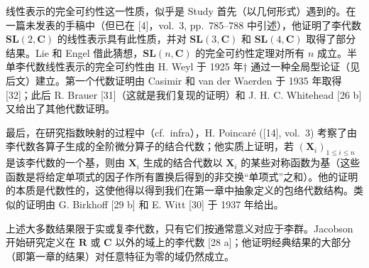 线性表示的完全可约性这一性质，似乎是 Study 首先（以几何形式）遇到的。在一篇未发表的手稿中（但已在 {[}4{]}，vol.~3, pp.~785--788 中引述），他证明了李代数 \(\mathbf{SL}(2,\mathbf{C})\) 的线性表示具有此性质，并对 \(\mathbf{SL}(3,\mathbf{C})\) 和 \(\mathbf{SL}(4,\mathbf{C})\) 取得了部分结果。Lie 和 Engel 借此猜想，\(\mathbf{SL}(n,\mathbf{C})\) 的完全可约性定理对所有 \(n\) 成立。半单李代数线性表示的完全可约性由 H. Weyl 于 1925 年† 通过一种全局型论证（见后文）建立。第一个代数证明由 Casimir 和 van der Waerden 于 1935 年取得 {[}32{]}；此后 R. Brauer {[}31{]}（这就是我们复现的证明）和 J. H. C. Whitehead {[}26 b{]} 又给出了其他代数证明。

最后，在研究指数映射的过程中（cf.~infra），H. Poincaré ({[}14{]}, vol.~3) 考察了由李代数各算子生成的全阶微分算子的结合代数；他实质上证明，若 \((\mathbf{X}_i)_{1\leqslant i\leqslant n}\) 是该李代数的一个基，则由 \(\mathbf{X}_i\) 生成的结合代数以 \(\mathbf{X}_i\) 的某些对称函数为基（这些函数是将给定单项式的因子作所有置换后得到的非交换“单项式”之和）。他的证明的本质是代数性的，这使他得以得到我们在第一章中抽象定义的包络代数结构。类似的证明由 G. Birkhoff {[}29 b{]} 和 E. Witt {[}30{]} 于 1937 年给出。

上述大多数结果限于实或复李代数，只有它们按通常意义对应于李群。Jacobson 开始研究定义在 \(\mathbf{R}\) 或 \(\mathbf{C}\) 以外的域上的李代数 {[}28 a{]}；他证明经典结果的大部分（即第一章的结果）对任意特征为零的域仍然成立。

